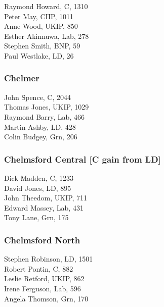 \documentclass[a4paper,openany,10pt]{book}
\begin{document}


Raymond Howard, C, 1310\\
Peter May, CIIP, 1011\\
Anne Wood, UKIP, 850\\
Esther Akinnuwa, Lab, 278\\
Stephen Smith, BNP, 59\\
Paul Westlake, LD, 26\\


\subsubsection*{Chelmer}



John Spence, C, 2044\\
Thomas Jones, UKIP, 1029\\
Raymond Barry, Lab, 466\\
Martin Ashby, LD, 428\\
Colin Budgey, Grn, 206\\


\subsubsection*{Chelmsford Central \hspace*{\fill}\nolinebreak[1]%
\enspace\hspace*{\fill}
[C gain from LD]}



Dick Madden, C, 1233\\
David Jones, LD, 895\\
John Theedom, UKIP, 711\\
Edward Massey, Lab, 431\\
Tony Lane, Grn, 175\\


\subsubsection*{Chelmsford North}



Stephen Robinson, LD, 1501\\
Robert Pontin, C, 882\\
Leslie Retford, UKIP, 862\\
Irene Ferguson, Lab, 596\\
Angela Thomson, Grn, 170\\
\end{document}
